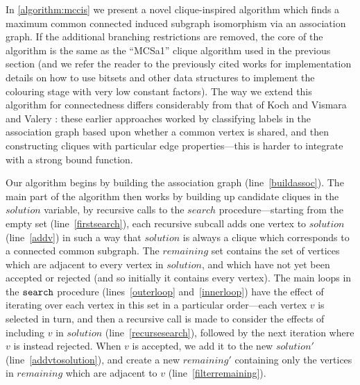 \documentclass{llncs}
\newcommand{\lineref}[1]{line~\ref{#1}}
\newcommand{\twolinesref}[2]{lines~\ref{#1} and~\ref{#2}}
\begin{document}
In \cref{algorithm:mccis} we present a novel clique-inspired algorithm which finds a maximum common
connected induced subgraph isomorphism via an association graph. If the additional branching
restrictions are removed, the core of the algorithm is the same as the ``MCSa1'' clique algorithm
used in the previous section (and we refer the reader to the previously cited works for
implementation details on how to use bitsets and other data structures to implement the colouring
stage with very low constant factors). The way we extend this algorithm for connectedness differs
considerably from that of Koch \cite{DBLP:journals/tcs/Koch01} and Vismara and Valery
\cite{DBLP:conf/mco/VismaraV08}: these earlier approaches worked by classifying labels in the
association graph based upon whether a common vertex is shared, and then constructing cliques with
particular edge properties---this is harder to integrate with a strong bound function.

Our algorithm begins by building the association graph (\lineref{buildassoc}). The main part of the algorithm
then works by building up candidate cliques in the $\mathit{solution}$ variable, by recursive calls
to the $\mathit{search}$ procedure---starting from the empty set (\lineref{firstsearch}), each
recursive subcall adds one vertex to $\mathit{solution}$ (\lineref{addv}) in such a way that
$\mathit{solution}$ is always a clique which corresponds to a connected common subgraph. The
$\mathit{remaining}$ set contains the set of vertices which are adjacent to every vertex in
$\mathit{solution}$, and which have not yet been accepted or rejected (and so initially it contains
every vertex). The main loops in the $\FuncSty{search}$ procedure
(\twolinesref{outerloop}{innerloop}) have the effect of iterating over each vertex in this set in a
particular order---each vertex $v$ is selected in turn, and then a recursive call is made to
consider the effects of including $v$ in $\mathit{solution}$ (\lineref{recursesearch}), followed by
the next iteration where $v$ is instead rejected. When $v$ is accepted, we add it to the new
$\mathit{solution'}$ (\lineref{addvtosolution}), and create a new $\mathit{remaining'}$ containing
only the vertices in $\mathit{remaining}$ which are adjacent to $v$ (\lineref{filterremaining}).
\end{document}
